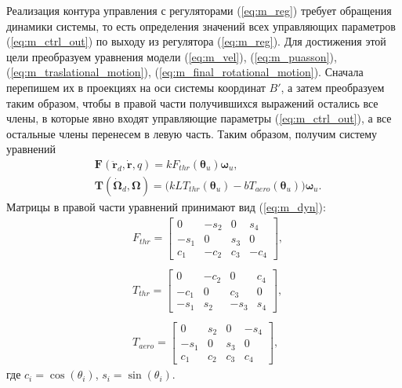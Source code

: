 Реализация контура управления с регуляторами (\ref{eq:m_reg}) требует обращения динамики системы, то есть определения значений всех управляющих параметров (\ref{eq:m_ctrl_out}) по выходу из регулятора (\ref{eq:m_reg}).
Для достижения этой цели преобразуем уравнения модели (\ref{eq:m_vel}), (\ref{eq:m_puasson}), (\ref{eq:m_traslational_motion}), (\ref{eq:m_final_rotational_motion}).
Сначала перепишем их в проекциях на оси системы координат $B'$, а затем
преобразуем таким образом, чтобы в правой части получившихся выражений остались все члены, в которые явно входят управляющие параметры (\ref{eq:m_ctrl_out}), а все остальные члены перенесем в левую часть. Таким образом, получим систему уравнений
\begin{equation} \label{eq:m_dyn}
\begin{aligned}
&\bm F(\ddot{\bm r}_d, \dot{\bm r}, q) = k F_{thr} (\bm \theta_u) \bm \omega_u,\\
&\bm T(\dot{\bm \Omega}_d, \bm\Omega) = \Big(
kLT_{thr}(\bm\theta_u) - bT_{aero}(\bm\theta_u)
\Big)
\bm \omega_u.
\end{aligned}
\end{equation}
Матрицы в правой части уравнений принимают вид (\ref{eq:m_dyn}):
\begin{equation} \label{eq:m_dyn_matrixes}
\begin{aligned}
&F_{thr} =
\begin{bmatrix}
0&-s_2&0&s_4\\
-s_1&0&s_3&0\\
c_1&-c_2&c_3&-c_4
\end{bmatrix},
\\
\phantom{}
\\
&T_{thr} =
\begin{bmatrix}
0&-c_2&0&c_4\\
-c_1&0&c_3&0\\
-s_1&s_2&-s_3&s_4
\end{bmatrix},
\\
\phantom{}
\\
&T_{aero} =
\begin{bmatrix}
0&s_2&0&-s_4\\
-s_1&0&s_3&0\\
c_1&c_2&c_3&c_4
\end{bmatrix},
\end{aligned}
\end{equation}
где $c_i = \cos(\theta_i)$, $s_i = \sin(\theta_i)$.

